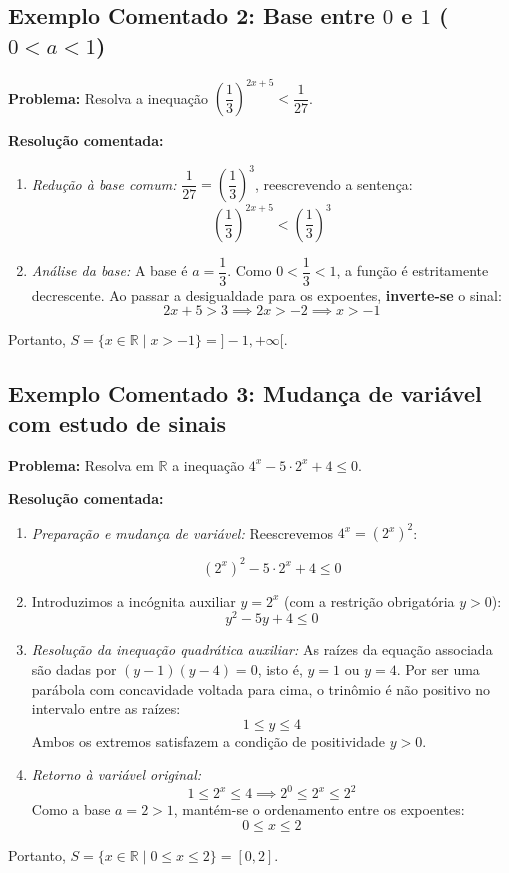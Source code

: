 \documentclass[12pt,a4paper]{report}
\begin{document}
	\vspace{0.3cm}
	
	\subsection*{Exemplo Comentado 2: Base entre $0$ e $1$ ($0 < a < 1$)}
	
	\textbf{Problema:} Resolva a inequação $\left(\dfrac{1}{3}\right)^{2x + 5} < \dfrac{1}{27}$.
	
	\textbf{Resolução comentada:}
	\begin{enumerate}[label=\alph*)]
		\item \textit{Redução à base comum:} $\dfrac{1}{27} = \left(\dfrac{1}{3}\right)^3$, reescrevendo a sentença:
		\[
		\left(\frac{1}{3}\right)^{2x + 5} < \left(\frac{1}{3}\right)^3
		\]
		\item \textit{Análise da base:} A base é $a = \dfrac{1}{3}$. Como $0 < \dfrac{1}{3} < 1$, a função é estritamente decrescente. Ao passar a desigualdade para os expoentes, \textbf{inverte-se} o sinal:
		\[
		2x + 5 > 3 \implies 2x > -2 \implies x > -1
		\]
	\end{enumerate}
	Portanto, $S = \{x \in \mathbb{R} \mid x > -1\} = {]-1, +\infty [}$.
	
	\vspace{0.3cm}
	
	\subsection*{Exemplo Comentado 3: Mudança de variável com estudo de sinais}
	
	\textbf{Problema:} Resolva em $\mathbb{R}$ a inequação $4^x - 5 \cdot 2^x + 4 \leqslant 0$.
	
	\textbf{Resolução comentada:}
	\begin{enumerate}[label=\alph*)]
		\item \textit{Preparação e mudança de variável:} Reescrevemos $4^x = (2^x)^2$:
		
		\[ (2^x)^2-5 \cdot 2^x + 4 \leqslant 0 \]
		
		
		\item Introduzimos a incógnita auxiliar $y = 2^x$ (com a restrição obrigatória $y > 0$):
		\[
		y^2 - 5y + 4 \leqslant 0
		\]
		\item \textit{Resolução da inequação quadrática auxiliar:} As raízes da equação associada são dadas por $(y - 1)(y - 4) = 0$, isto é, $y = 1$ ou $y = 4$. Por ser uma parábola com concavidade voltada para cima, o trinômio é não positivo no intervalo entre as raízes:
		\[
		1 \leqslant y \leqslant 4
		\]
		Ambos os extremos satisfazem a condição de positividade $y > 0$.
		\item \textit{Retorno à variável original:}
		\[
		1 \leqslant 2^x \leqslant 4 \implies 2^0 \leqslant 2^x \leqslant 2^2
		\]
		Como a base $a = 2 > 1$, mantém-se o ordenamento entre os expoentes:
		\[
		0 \leqslant x \leqslant 2
		\]
	\end{enumerate}
	Portanto, $S = \{x \in \mathbb{R} \mid 0 \leqslant x \leqslant 2\} = [0, 2]$.
	
\end{document}
